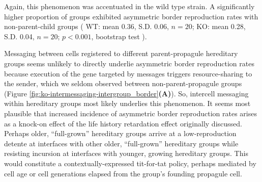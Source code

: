 Again, this phenomenon was accentuated in the wild type strain.
A significantly higher proportion of groups exhibited asymmetric border reproduction rates with non-parent-child groups
(%
WT: mean 0.36, S.D. 0.06, $n=20$;
KO: mean 0.28, S.D. 0.04, $n=20$;
$p < 0.001$, bootstrap test%
). %

Messaging between cells registered to different parent-propagule hereditary groups seems unlikely to directly underlie asymmetric border reproduction rates because execution of the gene targeted by messages triggers resource-sharing to the sender, which we seldom observed between non-parent-propagule groups (Figure \ref{fig:ko-intermessaging-intergroup_border}\textbf{(A)}).
So, intercell messaging within hereditary groups most likely underlies this phenomenon.
It seems most plausible that increased incidence of asymmetric border reproduction rates arises as a knock-on effect of the life history retardation effect originally discussed.
Perhaps older, ``full-grown'' hereditary groups arrive at a low-reproduction detente at interfaces with other older, ``full-grown'' hereditary groups while resisting incursion at interfaces with younger, growing hereditary groups.
This would constitute a contextually-expressed tit-for-tat policy, perhaps mediated by cell age or cell generations elapsed from the group's founding propagule cell.
